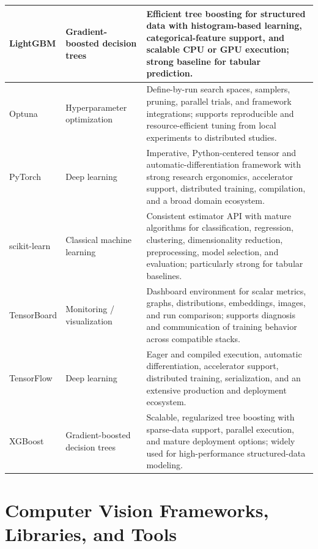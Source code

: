 \documentclass{article}
\newcounter{entry}[section]
\renewcommand{\theentry}{\thesection.\arabic{entry}}
\newcommand{\EntryRow}[5]{
    \noalign{
        \stepcounter{entry}
        \xdef\ENTRYNUM{\theentry}
        \phantomsection\label{entry:#1}
        \addcontentsline{toc}{subsubsection}{\ENTRYNUM\hspace{0.5cm}#2}
    }
    #2 #3 & #4 & #5 \\
    \hline
}
\begin{document}
\begin{longtable}{|p{}|p{}|p{}|}
    \EntryRow{lightgbm}{LightGBM}{\cite{ke2017lightgbm}}{Gradient-boosted decision trees}{Efficient tree boosting for structured data with histogram-based learning, categorical-feature support, and scalable CPU or GPU execution; strong baseline for tabular prediction.}

    \EntryRow{optuna}{Optuna}{\cite{akiba2019optuna}}{Hyperparameter optimization}{Define-by-run search spaces, samplers, pruning, parallel trials, and framework integrations; supports reproducible and resource-efficient tuning from local experiments to distributed studies.}

    \EntryRow{pytorch}{PyTorch}{\cite{paszke2019pytorch}}{Deep learning}{Imperative, Python-centered tensor and automatic-differentiation framework with strong research ergonomics, accelerator support, distributed training, compilation, and a broad domain ecosystem.}

    \EntryRow{scikit_learn}{scikit-learn}{\cite{pedregosa2011scikit}}{Classical machine learning}{Consistent estimator API with mature algorithms for classification, regression, clustering, dimensionality reduction, preprocessing, model selection, and evaluation; particularly strong for tabular baselines.}

    \EntryRow{tensorboard}{TensorBoard}{\cite{abadi2015tensorflow}}{Monitoring / visualization}{Dashboard environment for scalar metrics, graphs, distributions, embeddings, images, and run comparison; supports diagnosis and communication of training behavior across compatible stacks.}

    \EntryRow{tensorflow}{TensorFlow}{\cite{abadi2015tensorflow}}{Deep learning}{Eager and compiled execution, automatic differentiation, accelerator support, distributed training, serialization, and an extensive production and deployment ecosystem.}

    \EntryRow{xgboost}{XGBoost}{\cite{chen2016xgboost}}{Gradient-boosted decision trees}{Scalable, regularized tree boosting with sparse-data support, parallel execution, and mature deployment options; widely used for high-performance structured-data modeling.}
\end{longtable}




\clearpage




\section{Computer Vision Frameworks, Libraries, and Tools}
\end{document}
